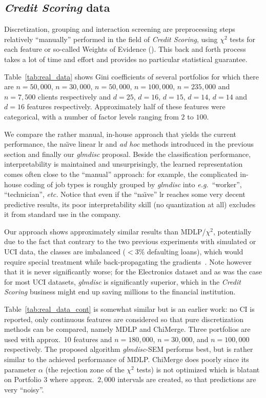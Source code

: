 \subsection{\textit{Credit Scoring} data} \label{subsec:exp_real}


Discretization, grouping and interaction screening are preprocessing steps relatively ``manually'' performed in the field of \textit{Credit Scoring}, using $\chi^2$ tests for each feature or so-called Weights of Evidence (\cite{zeng2014necessary}). This back and forth process takes a lot of time and effort and provides no particular statistical guarantee.

Table~\ref{tab:real_data} shows Gini coefficients of several portfolios for which there are $n=50,000$, $n=30,000$, $n=50,000$, $n=100,000$, $n=235,000$ and $n=7,500$ clients respectively and $d=25$, $d=16$, $d=15$, $d=14$, $d=14$ and $d=16$ features respectively. Approximately half of these features were categorical, with a number of factor levels ranging from $2$ to $100$. 

We compare the rather manual, in-house approach that yields the current performance, the na\"{\i}ve linear \gls{lr} and \textit{ad hoc} methods introduced in the previous section and finally our \textit{glmdisc} proposal. Beside the classification performance, interpretability is maintained and unsurprisingly, the learned representation comes often close to the ``manual'' approach: for example, the complicated in-house coding of job types is roughly grouped by \textit{glmdisc} into \textit{e.g.}\ ``worker'', ``technician'', \textit{etc.} Notice that even if the ``na\"{\i}ve'' \gls{lr} reaches some very decent predictive results, its poor interpretability skill (no quantization at all) excludes it from standard use in the company.

Our approach shows approximately similar results than MDLP/$\chi^2$, potentially due to the fact that contrary to the two previous experiments with simulated or UCI data, the classes are imbalanced ($< 3 \%$ defaulting loans), which would require special treatment while back-propagating the gradients~\cite{anand1993improved}. Note however that it is never significantly worse; for the Electronics dataset and as was the case for most UCI datasets, \textit{glmdisc} is significantly superior, which in the \textit{Credit Scoring} business might end up saving millions to the financial institution.

Table~\ref{tab:real_data_cont} is somewhat similar but is an earlier work: no CI is reported, only continuous features are considered so that pure discretization methods can be compared, namely MDLP and ChiMerge. Three portfolios are used with approx.\ 10 features and $n = 180{,}000$, $n = 30{,}000$, and $n = 100{,}000$ respectively. The proposed algorithm \textit{glmdisc}-SEM performs best, but is rather similar to the achieved performance of MDLP. ChiMerge does poorly since its parameter $\alpha$ (the rejection zone of the $\chi^2$ tests) is not optimized which is blatant on Portfolio 3 where approx.\ $2{,}000$ intervals are created, so that predictions are very ``noisy''.

